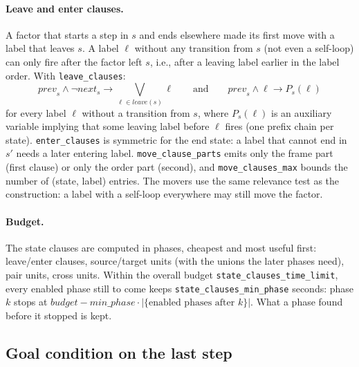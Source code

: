 \documentclass[manuscript, screen]{jair}
\newcommand{\opt}[1]{\texttt{#1}}
\newcommand{\prev}[1]{\mathit{prev}_{#1}}
\newcommand{\nxt}[1]{\mathit{next}_{#1}}
\begin{document}
\paragraph{Leave and enter clauses.} A factor that starts a step in $s$ and ends elsewhere made its
first move with a label that leaves $s$. A label $\ell$ without any transition from $s$ (not even a
self-loop) can only fire after the factor left $s$, i.e., after a leaving label earlier in the label
order. With \opt{leave\_clauses}:
\[
  \prev{s} \wedge \neg\nxt{s} \rightarrow \bigvee_{\ell \in \mathit{leave}(s)} \ell
  \qquad\text{and}\qquad
  \prev{s} \wedge \ell \rightarrow P_s(\ell)
\]
for every label $\ell$ without a transition from $s$, where $P_s(\ell)$ is an auxiliary variable
implying that some leaving label before $\ell$ fires (one prefix chain per state). \opt{enter\_clauses}
is symmetric for the end state: a label that cannot end in $s'$ needs a later entering label.
\opt{move\_clause\_parts} emits only the frame part (first clause) or only the order part (second),
and \opt{move\_clauses\_max} bounds the number of (state, label) entries. The movers use the same
relevance test as the construction: a label with a self-loop everywhere may still move the factor.

\paragraph{Budget.} The state clauses are computed in phases, cheapest and most useful first:
leave/enter clauses, source/target units (with the unions the later phases need), pair units, cross
units. Within the overall budget \opt{state\_clauses\_time\_limit}, every enabled phase still to come
keeps \opt{state\_clauses\_min\_phase} seconds: phase $k$ stops at
$\mathit{budget} - \mathit{min\_phase} \cdot |\{\text{enabled phases after } k\}|$. What a phase
found before it stopped is kept.

\subsection{Goal condition on the last step}
\end{document}
